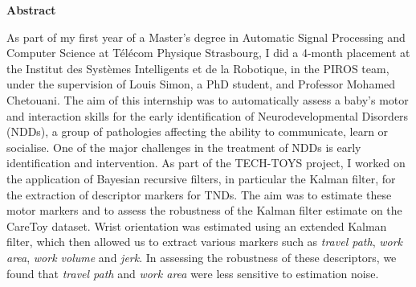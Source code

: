 \documentclass[8pt]{article}
\begin{document}



\newpage
\pagestyle{empty}
\clearpage

\Large \textbf{Abstract}
\par 
As part of my first year of a Master's degree in Automatic Signal Processing and Computer Science at Télécom Physique Strasbourg, I did a 4-month placement at the Institut des Systèmes Intelligents et de la Robotique, in the PIROS team, under the supervision of Louis Simon, a PhD student, and Professor Mohamed Chetouani. The aim of this internship was to automatically assess a baby's motor and interaction skills for the early identification of Neurodevelopmental Disorders (NDDs), a group of pathologies affecting the ability to communicate, learn or socialise. One of the major challenges in the treatment of NDDs is early identification and intervention. As part of the TECH-TOYS project, I worked on the application of Bayesian recursive filters, in particular the Kalman filter, for the extraction of descriptor markers for TNDs. The aim was to estimate these motor markers and to assess the robustness of the Kalman filter estimate on the CareToy dataset. Wrist orientation was estimated using an extended Kalman filter, which then allowed us to extract various markers such as \textit{travel path}, \textit{work area}, \textit{work volume} and \textit{jerk}. In assessing the robustness of these descriptors, we found that \textit{travel path} and \textit{work area} were less sensitive to estimation noise.
\end{document}
